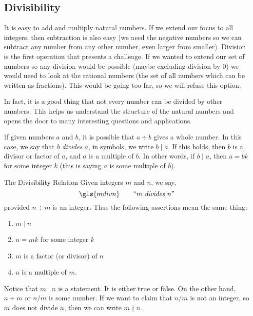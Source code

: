 \documentclass[12pt]{article}
\begin{document}
\subsection{Divisibility}

It is easy to add and multiply natural numbers.  If we extend our focus to all integers, then subtraction is also easy (we need the negative numbers so we can subtract any number from any other number, even larger from smaller).  Division is the first operation that presents a challenge.  If we wanted to extend our set of numbers so any division would be possible (maybe excluding division by 0) we would need to look at the rational numbers (the set of all numbers which can be written as fractions).  This would be going too far, so we will refuse this option.

In fact, it is a good thing that not every number can be divided by other numbers.  This helps us understand the structure of the natural numbers and opens the door to many interesting questions and applications.

If given numbers $a$ and $b$, it is possible that $a \div b$ gives a whole number.  In this case, we say that $b$ {\em divides} $a$, in symbols, we write $b \mid a$.  If this holds, then $b$ is a divisor or factor of $a$, and $a$ is a multiple of $b$.  In other words, if $b \mid a$, then $a = bk$ for some integer $k$ (this is saying $a$ is some multiple of $b$).  

\begin{defbox}{The Divisibility Relation}
	Given integers $m$ and $n$, we say,
	\[\gls{mdivn} \qquad \mbox{``$m$ {\em divides} $n$''}\]
	provided $n \div m$ is an integer.  Thus the following assertions mean the same thing:
	\begin{enumerate}
		\item $m \mid n$
		\item $n = mk$ for some integer $k$
		\item $m$ is a factor (or divisor) of $n$
		\item $n$ is a multiple of $m$.
	\end{enumerate}
\end{defbox}  

Notice that $m \mid n$ is a statement. It is either true or false.  On the other hand, $n \div m$ or  $n/m$ is some number.  If we want to claim that $n/m$ is not an integer, so $m$ does not divide $n$, then we can write $m \nmid n$.  
\end{document}
